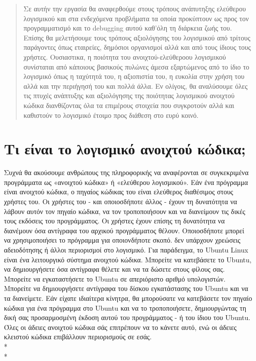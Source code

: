 \documentclass[a4paper, 11pt]{article}
\begin{document}
\tableofcontents


{\selectfont

\begin{abstract}
Σε αυτήν την εργασία θα αναφερθούμε στους τρόπους ανάπυτηξης ελεύθερου λογισμικού
και στα ενδεχόμενα προβλήματα τα οποία προκύπτουν ως προς τον προγραμματισμό και το 
\textlatin{debugging} αυτού καθ'όλη τη διάρκεια ζωής του. Επίσης θα μελετήσουμε τους 
τρόπους αξιολόγησης του λογισμικού από τρίτους παράγοντες όπως εταιρείες, δημόσιοι οργανισμοί 
αλλά και από τους ίδιους τους χρήστες. Ουσιαστικα, η ποιότητα του ανοιχτού-ελεύθεροου λογισμικού 
συνίσταται από κάποιους βασικούς πυλώνες άμεσα εξαρτώμενος από το ίδιο το λογισμικό όπως η ταχύτητά
του, η αξιοπιστία του, η ευκολία στην χρήση του αλλά και την περιήγησή του και πολλά άλλα. Εν ολίγοις, 
θα αναλύσουμε όλες τις πτυχές ανάπτυξης και αξιολόγησης της ποιότητας λογισμικού ανοιχτού κώδικα 
διανθίζοντας όλα τα επιμέρους στοιχεία που συγκροτούν αλλά και καθιστούν το λογισμικό έτοιμο προς διάθεση 
στο ευρύ κοινό.
\end{abstract}

{\selectfont\section{Τι είναι το λογισμικό ανοιχτού κώδικα\textlatin{;}}}
 Συχνά θα ακούσουμε ανθρώπους της πληροφορικής να αναφέρονται σε συγκεκριμένα προγράμματα ως «ανοιχτού κώδικα» ή «ελεύθερου λογισμικού». Εάν ένα πρόγραμμα είναι ανοιχτού κώδικα, ο πηγαίος κώδικας του είναι ελεύθερος διαθέσιμος στους χρήστες του. Οι χρήστες του - και οποιοσδήποτε άλλος - έχουν τη δυνατότητα να λάβουν αυτόν τον πηγαίο κώδικα, να τον τροποποιήσουν και να διανείμουν τις δικές τους εκδόσεις του προγράμματος. Οι χρήστες έχουν επίσης τη δυνατότητα να διανέμουν όσα αντίγραφα του αρχικού προγράμματος θέλουν. Οποιοσδήποτε μπορεί να χρησιμοποιήσει το πρόγραμμα για οποιονδήποτε σκοπό. δεν υπάρχουν χρεώσεις αδειοδότησης ή άλλοι περιορισμοί στο λογισμικό. Για παράδειγμα, το \textlatin{Ubuntu Linux} είναι ένα λειτουργικό σύστημα ανοιχτού κώδικα. Μπορείτε να κατεβάσετε το \textlatin{Ubuntu}, να δημιουργήσετε όσα αντίγραφα θέλετε και να τα δώσετε στους φίλους σας. Μπορείτε να εγκαταστήσετε το \textlatin{Ubuntu} σε απεριόριστο αριθμό υπολογιστών. Μπορείτε να δημιουργήσετε αντίγραφα του δίσκου εγκατάστασης του \textlatin{Ubuntu} και να τα διανείμετε. Εάν είχατε ιδιαίτερα κίνητρα, θα μπορούσατε να κατεβάσετε τον πηγαίο κώδικα για ένα πρόγραμμα στο \textlatin{Ubuntu} και να το τροποποιήσετε, δημιουργώντας τη δική σας προσαρμοσμένη έκδοση αυτού του προγράμματος - ή του ίδιου του \textlatin{Ubuntu}. Όλες οι άδειες ανοιχτού κώδικα σάς επιτρέπουν να το κάνετε αυτό, ενώ οι άδειες κλειστού κώδικα επιβάλλουν περιορισμούς σε εσάς.\\*
\\*
}
\end{document}
